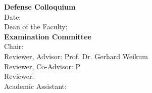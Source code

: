 
%
%
%

\newpage
\noindent
\textbf{Defense Colloquium} \\[0.25cm]
Date: \hspace{3.2cm}\\[1cm]
Dean of the Faculty: \hspace{0.88cm} \\[2.5cm]
%
\textbf{Examination Committee} \\[0.25cm]
Chair: \hspace{3.1cm}\\[1.0cm]%
%
Reviewer, Advisor: \hspace{1.05cm} Prof. Dr. Gerhard Weikum\\[1.0cm]
%
Reviewer, Co-Advisor: \hspace{0.55cm} P\\[1.0cm]
%
Reviewer: \hspace{2.50cm} \\[1.0cm]
%
Academic Assistant: \hspace{0.92cm}\\[1.0cm]%

\cleardoublepage

%

\cleardoublepage



